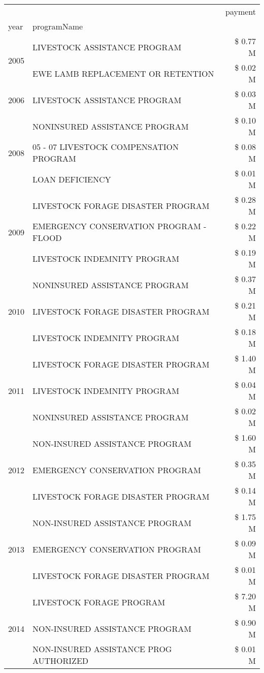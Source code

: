 \begin{tabular}{llr}
\toprule
 &  & payment \\
year & programName &  \\
\midrule
\multirow[t]{2}{*}{2005} & LIVESTOCK ASSISTANCE PROGRAM & \$ 0.77 M \\
 & EWE LAMB REPLACEMENT OR RETENTION & \$ 0.02 M \\
\cline{1-3}
2006 & LIVESTOCK ASSISTANCE PROGRAM & \$ 0.03 M \\
\cline{1-3}
\multirow[t]{3}{*}{2008} & NONINSURED ASSISTANCE PROGRAM & \$ 0.10 M \\
 & 05 - 07 LIVESTOCK COMPENSATION PROGRAM & \$ 0.08 M \\
 & LOAN DEFICIENCY & \$ 0.01 M \\
\cline{1-3}
\multirow[t]{3}{*}{2009} & LIVESTOCK FORAGE DISASTER  PROGRAM & \$ 0.28 M \\
 & EMERGENCY CONSERVATION PROGRAM - FLOOD & \$ 0.22 M \\
 & LIVESTOCK INDEMNITY PROGRAM & \$ 0.19 M \\
\cline{1-3}
\multirow[t]{3}{*}{2010} & NONINSURED ASSISTANCE PROGRAM & \$ 0.37 M \\
 & LIVESTOCK FORAGE DISASTER PROGRAM & \$ 0.21 M \\
 & LIVESTOCK INDEMNITY PROGRAM & \$ 0.18 M \\
\cline{1-3}
\multirow[t]{3}{*}{2011} & LIVESTOCK FORAGE DISASTER PROGRAM & \$ 1.40 M \\
 & LIVESTOCK INDEMNITY PROGRAM & \$ 0.04 M \\
 & NONINSURED ASSISTANCE PROGRAM & \$ 0.02 M \\
\cline{1-3}
\multirow[t]{3}{*}{2012} & NON-INSURED ASSISTANCE PROGRAM & \$ 1.60 M \\
 & EMERGENCY CONSERVATION PROGRAM & \$ 0.35 M \\
 & LIVESTOCK FORAGE DISASTER PROGRAM & \$ 0.14 M \\
\cline{1-3}
\multirow[t]{3}{*}{2013} & NON-INSURED ASSISTANCE PROGRAM & \$ 1.75 M \\
 & EMERGENCY CONSERVATION PROGRAM & \$ 0.09 M \\
 & LIVESTOCK FORAGE DISASTER PROGRAM & \$ 0.01 M \\
\cline{1-3}
\multirow[t]{3}{*}{2014} & LIVESTOCK FORAGE PROGRAM & \$ 7.20 M \\
 & NON-INSURED ASSISTANCE PROGRAM & \$ 0.90 M \\
 & NON-INSURED ASSISTANCE PROG AUTHORIZED & \$ 0.01 M \\

\end{tabular}
